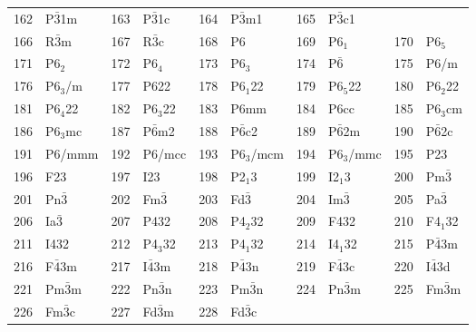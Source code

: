 \documentclass[11pt,a4paper]{report}
\begin{document}
\begin{table}[H]
\begin{center}
\begin{tabular}{||r|l||r|l||r|l||r|l||r|l||}
162    & P$\bar{3}$1m       & 
163    & P$\bar{3}$1c       & 
164    & P$\bar{3}$m1       & 
165    & P$\bar{3}$c1       \\
166    & R$\bar{3}$m        & 
167    & R$\bar{3}$c        & 
168    & P6                 & 
169    & P6$_1$             & 
170    & P6$_5$             \\
171    & P6$_2$             & 
172    & P6$_4$             & 
173    & P6$_3$             & 
174    & P$\bar{6}$                & 
175    & P6/m               \\
176    & P6$_3$/m           & 
177    & P622               & 
178    & P6$_1$22           & 
179    & P6$_5$22           & 
180    & P6$_2$22           \\
181    & P6$_4$22           & 
182    & P6$_3$22           & 
183    & P6mm               & 
184    & P6cc               & 
185    & P6$_3$cm           \\
186    & P6$_3$mc           & 
187    & P$\bar{6}$m2       & 
188    & P$\bar{6}$c2       & 
189    & P$\bar{6}$2m       & 
190    & P$\bar{6}$2c       \\
191    & P6/mmm             & 
192    & P6/mcc             & 
193    & P6$_3$/mcm         & 
194    & P6$_3$/mmc         & 
195    & P23                \\
196    & F23                & 
197    & I23                & 
198    & P2$_1$3            & 
199    & I2$_1$3            & 
200    & Pm$\bar{3}$        \\
201    & Pn$\bar{3}$        & 
202    & Fm$\bar{3}$        & 
203    & Fd$\bar{3}$        & 
204    & Im$\bar{3}$        & 
205    & Pa$\bar{3}$        \\
206    & Ia$\bar{3}$        & 
207    & P432               & 
208    & P4$_2$32           & 
209    & F432               & 
210    & F4$_1$32           \\
211    & I432               & 
212    & P4$_3$32           & 
213    & P4$_1$32           & 
214    & I4$_1$32           & 
215    & P$\bar{4}$3m       \\
216    & F$\bar{4}$3m       & 
217    & I$\bar{4}$3m       & 
218    & P$\bar{4}$3n       & 
219    & F$\bar{4}$3c       & 
220    & I$\bar{4}$3d       \\
221    & Pm$\bar{3}$m       & 
222    & Pn$\bar{3}$n       & 
223    & Pm$\bar{3}$n       & 
224    & Pn$\bar{3}$m       & 
225    & Fm$\bar{3}$m       \\
226    & Fm$\bar{3}$c       & 
227    & Fd$\bar{3}$m       & 
228    & Fd$\bar{3}$c       & 

\end{tabular}
\end{center}
\end{table}
\end{document}
